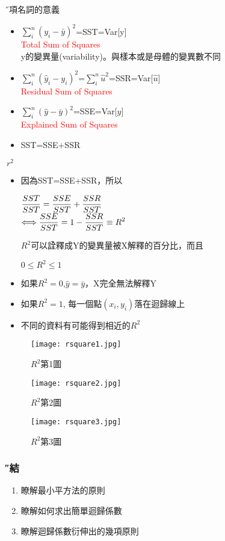 \documentclass[xcolor=dvipsnames]{beamer}
\begin{document}
\begin{frame}{\H 各項名詞的意義}
\begin{itemize}
\item $\sum _{i}^n(y_{i}-\bar{y})^2$=SST=Var[y]\\
{\textcolor{red}{Total Sum of Squares}}\\
y的變異量(variability)。與樣本或是母體的變異數不同
\medskip
\item $\sum _{i}^n(\hat{y}_{i}-y_{i})^2$=$\sum _{i}^n\hat{u}^2$=SSR=Var[$\hat{u}$]\\
{\textcolor{red}{Residual Sum of Squares}}\\
\medskip
\item $\sum _{i}^n(\hat{y}-\bar{y})^2$=SSE=Var[$\hat{y}$]\\
{\textcolor{red}{Explained Sum of Squares}}\\
\medskip
\item SST=SSE+SSR
\end{itemize}
\end{frame}
\begin{frame}{$r^2$}
\begin{itemize}
\item 因為SST=SSE+SSR，所以
\begin{center}
$\mathlarger{\frac{SST}{SST}=\frac{SSE}{SST}+\frac{SSR}{SST}}$\\
$\mathlarger{\Longleftrightarrow \frac{SSE}{SST}=1-\frac{SSR}{SST}\equiv R^2}$
\end{center}
$ R^{2} $可以詮釋成Y的變異量被X解釋的百分比，而且
\begin{center}
$0\leq R^{2} \leq 1 $
\end{center}
\item 如果$R^{2}=0$,$ \hat{y}=\bar{y} $，X完全無法解釋Y
\item 如果$R^{2}=1$, 每一個點$(x_{i},y_{i})$落在迴歸線上
\item 不同的資料有可能得到相近的$ R^2 $
\end{itemize}
\end{frame}
\begin{frame}
\begin{figure}
\texttt{[image: rsquare1.jpg]}
\caption{$R^2$第1圖}
\end{figure}
\end{frame}

\begin{frame}
\begin{figure}
\texttt{[image: rsquare2.jpg]}
\caption{$R^2$第2圖}
\end{figure}
\end{frame}

\begin{figure}
\texttt{[image: rsquare3.jpg]}
\caption{$R^2$第3圖}
\end{figure}

\begin{frame}\frametitle{\H 總結}
\begin{enumerate}
\item {\K 瞭解最小平方法的原則}
\item {\K 瞭解如何求出簡單迴歸係數}
\item {\K 瞭解迴歸係數衍伸出的幾項原則}

\end{enumerate}
\end{frame}
\end{document}
